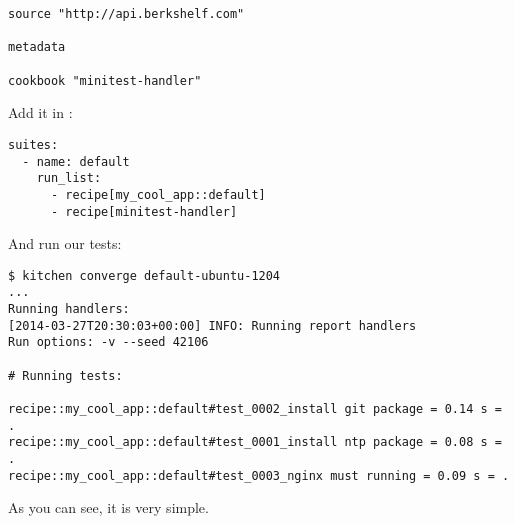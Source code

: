 \begin{lstlisting}[label=lst:testing-minitest5]
source "http://api.berkshelf.com"

metadata

cookbook "minitest-handler"
\end{lstlisting}

Add it in :

\begin{lstlisting}[label=lst:testing-minitest6]
suites:
  - name: default
    run_list:
      - recipe[my_cool_app::default]
      - recipe[minitest-handler]
\end{lstlisting}

And run our tests:

\begin{lstlisting}[label=lst:testing-minitest6]
$ kitchen converge default-ubuntu-1204
...
Running handlers:
[2014-03-27T20:30:03+00:00] INFO: Running report handlers
Run options: -v --seed 42106

# Running tests:

recipe::my_cool_app::default#test_0002_install git package = 0.14 s = .
recipe::my_cool_app::default#test_0001_install ntp package = 0.08 s = .
recipe::my_cool_app::default#test_0003_nginx must running = 0.09 s = .
\end{lstlisting}

As you can see, it is very simple.